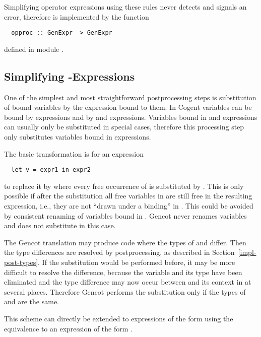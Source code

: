 Simplifying operator expressions using these rules never detects and signals an error, therefore is implemented by the function
\begin{verbatim}
  opproc :: GenExpr -> GenExpr
\end{verbatim}
defined in module .

\subsection{Simplifying -Expressions}
\label{impl-post-let}

One of the simplest and most straightforward postprocessing steps is substitution of bound variables by the
expression bound to them. In Cogent variables can be bound by  expressions and by  and 
expressions. Variables bound in  and  expressions can usually only be substituted in special cases, 
therefore this processing step only substitutes variables bound in  expressions. 

The basic transformation is for an expression
\begin{verbatim}
  let v = expr1 in expr2
\end{verbatim}
to replace it by  where every free occurrence of  is substituted by . This is only 
possible if after the substitution all free variables in  are still free in the resulting expression, i.e., 
they are not ``drawn under a binding'' in . This could be avoided by consistent renaming of variables bound in 
. Gencot never renames variables and does not substitute in this case.

The Gencot translation may produce code where the types of  and  differ. Then the type differences are
resolved by postprocessing, as described in Section~\ref{impl-post-types}. If the substitution would be performed before,
it may be more difficult to resolve the difference, because the variable and its type have been eliminated and the type
difference may now occur between  and its context in  at several places. Therefore Gencot performs
the substitution only if the types of  and  are the same.

This scheme can directly be extended to expressions of the form  using the
equivalence to an expression of the form .

